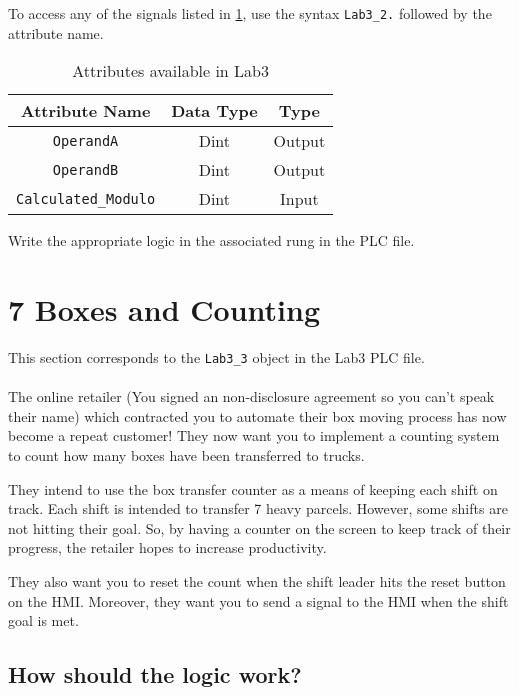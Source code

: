 To access any of the signals listed in \tableautorefname \ref{Table:Lab3_2Attributes}, use the syntax \verb|Lab3_2.| followed by the attribute name. 

\begin{table}[h]
\centering
\caption{Attributes available in Lab3}
\label{Table:Lab3_2Attributes}
\begin{tabular}{c c c}
\toprule
Attribute Name & Data Type & Type\\
\midrule
\verb|OperandA| & Dint & Output \\
\verb|OperandB| & Dint & Output \\
\midrule
\verb|Calculated_Modulo| & Dint & Input\\
\bottomrule
\end{tabular}
\end{table}

Write the appropriate logic in the associated rung in the PLC file.

\TASignatureSlot


\section{7 Boxes and Counting}

This section corresponds to the \verb|Lab3_3| object in the Lab3 PLC file.
\\ 
\\

The online retailer (You signed an non-disclosure agreement so you can't speak their name) which contracted you to automate their box moving process has now become a repeat customer! They now want you to implement a counting system to count how many boxes have been transferred to trucks.

They intend to use the box transfer counter as a means of keeping each shift on track. Each shift is intended to transfer 7 heavy parcels. However, some shifts are not hitting their goal. So, by having a counter on the screen to keep track of their progress, the retailer hopes to increase productivity. 

They also want you to reset the count when the shift leader hits the reset button on the HMI. Moreover, they want you to send a signal to the HMI when the shift goal is met. 

\subsection{How should the logic work?}

